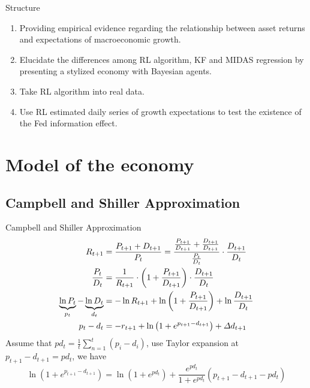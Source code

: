 \documentclass[UTF8, 16pt]{beamer}
\begin{document}
\begin{CJK*}{UTF8}{gbsn}
\begin{frame}{Structure}
	\begin{enumerate}
		\item Providing empirical evidence regarding the \alert{relationship} between \alert{asset returns} and \alert{expectations of macroeconomic growth}.
		\item Elucidate the differences among \alert{RL} algorithm, \alert{KF} and \alert{MIDAS} regression by presenting \alert{a stylized economy} with \alert{Bayesian agents}.
		\item Take \alert{RL} algorithm into \alert{real data}.
		\item Use \alert{RL} estimated daily series of growth expectations to test the existence of \alert{the Fed information effect}.
	\end{enumerate}
\end{frame}

\section{Model of the economy}
\subsection{Campbell and Shiller Approximation}
\begin{frame}{Campbell and Shiller Approximation}
	$$
	\begin{aligned}
		R_{t+1}
		&=\small{\frac{P_{t+1}+D_{t+1}}{P_t}}
		=\frac{\frac{P_{t+1}}{D_{t+1}}+\frac{D_{t+1}}{D_{t+1}}}{\frac{P_t}{D_t}}\cdot \frac{D_{t+1}}{D_t}
		\\
		\frac{P_t}{D_t}&=\frac{1}{R_{t+1}}\cdot \left( 1+\frac{P_{t+1}}{D_{t+1}} \right) \cdot \frac{D_{t+1}}{D_t}
		\\
		\underbrace{\ln P_t}_{p_t}-\underbrace{\ln D_t}_{d_t}&=-\ln R_{t+1}+\ln \left( 1+\frac{P_{t+1}}{D_{t+1}} \right) +\ln \frac{D_{t+1}}{D_t}
		\\
		p_t-d_t&=-r_{t+1}+\ln{\left( 1+e^{p_{t+1}-d_{t+1}} \right)} +\varDelta d_{t+1}
	\end{aligned}
	$$
	Assume that $pd_{t}=\frac{1}{t}\sum_{n=1}^t{(p_i-d_i)}$, use Taylor expansion at $p_{t+1}-d_{t+1}=pd_{t}$, we have 
	$$
	\ln{\left( 1+e^{p_{t+1}-d_{t+1}} \right)}=\ln(1+e^{pd_t})+\frac{e^{pd_t}}{1+e^{pd_t}}(p_{t+1}-d_{t+1}-pd_t)
	$$
\end{frame}


\end{CJK*}
\end{document}
